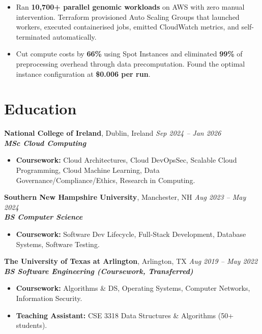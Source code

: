 \documentclass[10pt,a4paper]{article}
\begin{document}
\begin{itemize}
  \item Ran \textbf{10,700+ parallel genomic workloads} on AWS with zero manual intervention. Terraform provisioned Auto Scaling Groups that launched workers, executed containerised jobs, emitted CloudWatch metrics, and self-terminated automatically.
  \item Cut compute costs by \textbf{66\%} using Spot Instances and eliminated \textbf{99\%} of preprocessing overhead through data precomputation. Found the optimal instance configuration at \textbf{\$0.006 per run}.
\end{itemize}
\vspace{0.20em}

\section*{Education}
\textbf{National College of Ireland}, Dublin, Ireland \hfill \textit{Sep 2024 -- Jan 2026}\\[-0.15em]
\textbf{\textit{MSc Cloud Computing}}\\[-0.25em]
\begin{itemize}
  \item \textbf{Coursework:} Cloud Architectures, Cloud DevOpsSec, Scalable Cloud Programming, Cloud Machine Learning, Data Governance/Compliance/Ethics, Research in Computing.
\end{itemize}
\vspace{0.20em}
\textbf{Southern New Hampshire University}, Manchester, NH \hfill \textit{Aug 2023 -- May 2024}\\[-0.15em]
\textbf{\textit{BS Computer Science}}\\[-0.25em]
\begin{itemize}
  \item \textbf{Coursework:} Software Dev Lifecycle, Full-Stack Development, Database Systems, Software Testing.
\end{itemize}
\vspace{0.20em}
\textbf{The University of Texas at Arlington}, Arlington, TX \hfill \textit{Aug 2019 -- May 2022}\\[-0.15em]
\textbf{\textit{BS Software Engineering (Coursework, Transferred)}}\\[-0.25em]
\begin{itemize}
  \item \textbf{Coursework:} Algorithms \& DS, Operating Systems, Computer Networks, Information Security.
  \item \textbf{Teaching Assistant:} CSE 3318 Data Structures \& Algorithms (50+ students).
\end{itemize}
\end{document}
